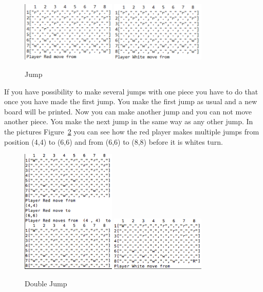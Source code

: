 \documentclass[12pt,a4paper]{article}
\begin{document}
\begin{figure}[htp]
\centering
\includegraphics[width= 0.4\textwidth]{jump1.PNG}
\includegraphics[width= 0.4\textwidth]{jump2.PNG}
\caption{Jump}
\label{fig4}
\end{figure}


If you have possibility to make several jumps with one piece you have to do that once you have made the first jump. You make the first jump as usual and a new board will be printed. Now you can make another jump and you can not move another piece. You make the next jump in the same way as any other jump. In the pictures Figure~\ref{fig5} you can see how the red player makes multiple jumps from position (4,4) to (6,6) and from (6,6) to (8,8) before it is whites turn.


\begin{figure}[htp]
\centering
\includegraphics[width= 0.4\textwidth]{mj1.PNG}
\includegraphics[width= 0.4\textwidth]{mj2.PNG}
\caption{Double Jump}
\label{fig5}
\end{figure}
\end{document}
